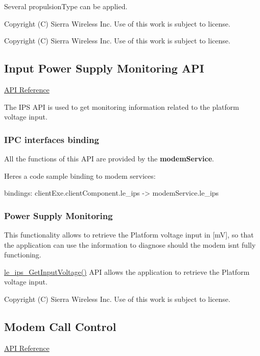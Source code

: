 Several \textquotesingle{}propulsion\+Type\textquotesingle{} can be applied.





Copyright (C) Sierra Wireless Inc. Use of this work is subject to license.





Copyright (C) Sierra Wireless Inc. Use of this work is subject to license. \hypertarget{c_ips}{}\subsection{Input Power Supply Monitoring A\+P\+I}\label{c_ips}
\hyperlink{le__ips__interface_8h}{A\+P\+I Reference}





The I\+P\+S A\+P\+I is used to get monitoring information related to the platform voltage input.\hypertarget{c_ips_le_ips_binding}{}\subsubsection{I\+P\+C interfaces binding}\label{c_ips_le_ips_binding}
All the functions of this A\+P\+I are provided by the {\bfseries modem\+Service}.

Here\textquotesingle{}s a code sample binding to modem services\+: \begin{DoxyVerb}bindings:
{
   clientExe.clientComponent.le_ips -> modemService.le_ips
}
\end{DoxyVerb}
\hypertarget{c_ips_Input}{}\subsubsection{Power Supply Monitoring}\label{c_ips_Input}
This functionality allows to retrieve the Platform voltage input in \mbox{[}m\+V\mbox{]}, so that the application can use the information to diagnose should the modem isn\textquotesingle{}t fully functioning.

\hyperlink{le__ips__interface_8h_ad4e7387907ce93bd409007bca25ae433}{le\+\_\+ips\+\_\+\+Get\+Input\+Voltage()} A\+P\+I allows the application to retrieve the Platform voltage input.





Copyright (C) Sierra Wireless Inc. Use of this work is subject to license. \hypertarget{c_mcc}{}\subsection{Modem Call Control}\label{c_mcc}
\hyperlink{le__mcc__interface_8h}{A\+P\+I Reference}





